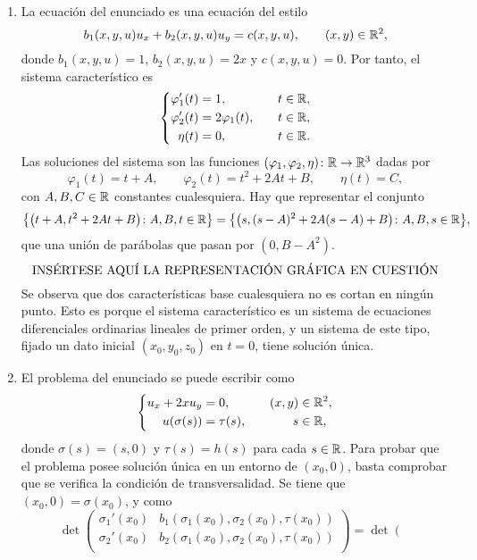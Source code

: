 \documentclass[a4paper, 12pt, extrafontsizes]{memoir}
\begin{document}
\begin{solution}
\hfill
\begin{enumerate}
    \item La ecuación del enunciado es una ecuación del estilo
    \[b_1(x,y,u)u_x+b_2(x,y,u)u_y = c(x,y,u), \qquad (x,y) \in \mathbb R^2,\]
    donde $b_1(x,y,u) = 1$, $b_2(x,y,u) = 2x$ y $c(x,y,u) = 0$. Por tanto, el sistema característico es
    \[\left\{\begin{alignedat}{3}
        \varphi_1'(t) &= 1, \qquad & t &\in \mathbb R, \\
        \varphi_2'(t) &= 2\varphi_1(t), \qquad & t &\in \mathbb R, \\
        \eta(t) &= 0, \qquad & t &\in \mathbb R.
    \end{alignedat}\right.\]
    Las soluciones del sistema son las funciones $(\varphi_1,\varphi_2,\eta) \colon \mathbb R \to \mathbb R^3$ dadas por
    \[\varphi_1(t) = t+A, \qquad \varphi_2(t) =  t^2+2At+B, \qquad \eta(t) = C,\]
    con $A,B,C \in \mathbb R$ constantes cualesquiera. Hay que representar el conjunto
    \[\bigl\{\bigl(t+A, t^2+2At+B\bigr) \colon A,B, t \in \mathbb R\bigr\} = \bigl\{\bigl(s, (s-A)^2+2A(s-A)+B\bigr) \colon A,B, s \in \mathbb R\bigr\},\]
    que una unión de parábolas que pasan por $(0,B-A^2)$.
    \[\textup{INSÉRTESE AQUÍ LA REPRESENTACIÓN GRÁFICA EN CUESTIÓN}\]
    Se observa que dos características base cualesquiera no es cortan en ningún punto. Esto es porque el sistema característico es un sistema de ecuaciones diferenciales ordinarias lineales de primer orden, y un sistema de este tipo, fijado un dato inicial $(x_0,y_0,z_0)$ en $t = 0$, tiene solución única. 
    \item El problema del enunciado se puede escribir como     
    \[\left\{\begin{alignedat}{3}
        u_x+2xu_y &= 0, \qquad & (x,y) &\in \mathbb R^2, \\
        u(\sigma(s)) &= \tau(s), \qquad & s &\in \mathbb R,
    \end{alignedat}\right.\]
    donde $\sigma(s) = (s,0)$ y $\tau(s) = h(s)$ para cada $s \in \mathbb R$. Para probar que el problema posee solución única en un entorno de $(x_0,0)$, basta comprobar que se verifica la condición de transversalidad. Se tiene que $(x_0,0) = \sigma(x_0)$, y como
    \[\det\left(\begin{array}{cc}
        \sigma_1'(x_0) & b_1(\sigma_1(x_0),\sigma_2(x_0),\tau(x_0)) \\
        \sigma_2'(x_0) & b_2(\sigma_1(x_0),\sigma_2(x_0),\tau(x_0)) \\
    \end{array}\right) = \det\left(\begin{array}{cc}

\end{array}\]
\end{enumerate}
\end{solution}
\end{document}
